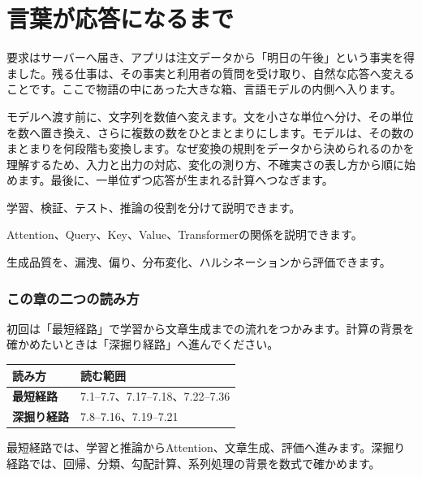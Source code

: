 \chapter{言葉が応答になるまで}
\label{chap:machine-learning}

\begin{chapterabstract}
要求はサーバーへ届き、アプリは注文データから「明日の午後」という事実を得ました。残る仕事は、その事実と利用者の質問を受け取り、自然な応答へ変えることです。ここで物語の中にあった大きな箱、言語モデルの内側へ入ります。

モデルへ渡す前に、文字列を数値へ変えます。文を小さな単位へ分け、その単位を数へ置き換え、さらに複数の数をひとまとまりにします。モデルは、その数のまとまりを何段階も変換します。なぜ変換の規則をデータから決められるのかを理解するため、入力と出力の対応、変化の測り方、不確実さの表し方から順に始めます。最後に、一単位ずつ応答が生まれる計算へつなぎます。
\end{chapterabstract}

\begin{learninggoals}
  \item 学習、検証、テスト、推論の役割を分けて説明できます。
  \item Attention、Query、Key、Value、Transformerの関係を説明できます。
  \item 生成品質を、漏洩、偏り、分布変化、ハルシネーションから評価できます。
\end{learninggoals}


\subsection*{この章の二つの読み方}

初回は「最短経路」で学習から文章生成までの流れをつかみます。計算の背景を確かめたいときは「深掘り経路」へ進んでください。

\begin{tabularx}{\textwidth}{@{}>{\bfseries}p{30mm}Y@{}}
  \toprule
  読み方 & 読む範囲 \\
  \midrule
  最短経路 & 7.1--7.7、7.17--7.18、7.22--7.36 \\
  深掘り経路 & 7.8--7.16、7.19--7.21 \\
  \bottomrule
\end{tabularx}

最短経路では、学習と推論からAttention、文章生成、評価へ進みます。深掘り経路では、回帰、分類、勾配計算、系列処理の背景を数式で確かめます。


